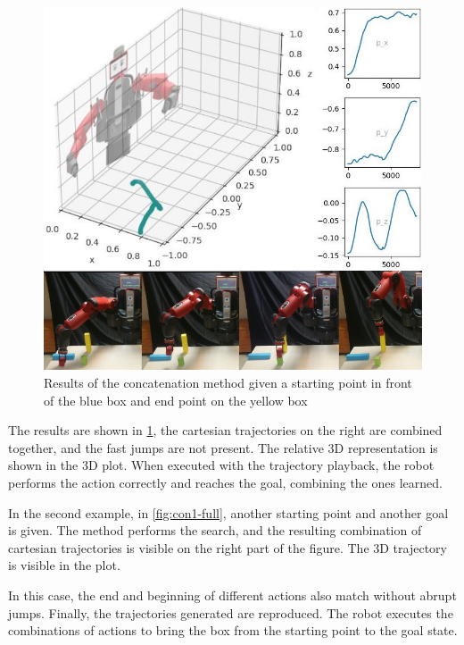 \begin{figure}
    \centering
    \includegraphics[width=0.9\linewidth]{Images/con2-full.jpg}
    \caption{ Results of the concatenation method given a starting point in front of the blue box and end point on the yellow box }
    \label{fig:con2-full}
\end{figure}

The results are shown in \cref{fig:con2-full}, the cartesian trajectories on the right are combined together, and the fast jumps are not present. The relative 3D representation is shown in the 3D plot. When executed with the trajectory playback, the robot performs the action correctly and reaches the goal, combining the ones learned.

In the second example, in \cref{fig:con1-full}, another starting point and another goal is given. The method performs the search, and the resulting combination of cartesian trajectories is visible on the right part of the figure. The 3D trajectory is visible in the plot. 

In this case, the end and beginning of different actions also match without abrupt jumps. 
Finally, the trajectories generated are reproduced. The robot executes the combinations of actions to bring the box from the starting point to the goal state. 

